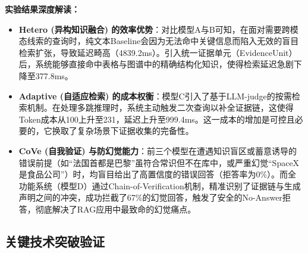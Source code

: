 \begin{table}[H]
\centering
\caption{核心机制消融实验结果对比（基于真实HF模型运行）}
\label{tab:ablation_matrix}
\end{table}

\textbf{实验结果深度解读：}
\begin{itemize}
    \item \textbf{Hetero (异构知识融合) 的效率优势}：对比模型A与B可知，在面对需要跨模态线索的查询时，纯文本Baseline会因为无法命中关键信息而陷入无效的盲目检索扩张，导致延迟畸高（4839.2ms）。引入统一证据单元（EvidenceUnit）后，系统能够直接命中表格与图谱中的精确结构化知识，使得检索延迟急剧下降至377.8ms。
    \item \textbf{Adaptive (自适应检索) 的成本权衡}：模型C引入了基于LLM-judge的按需检索机制。在处理多跳推理时，系统主动触发二次查询以补全证据链，这使得Token成本从100上升至231，延迟上升至999.4ms。这一成本的增加是可控且必要的，它换取了复杂场景下证据收集的完备性。
    \item \textbf{CoVe (自我验证) 与防幻觉能力}：前三个模型在遭遇知识盲区或蓄意诱导的错误前提（如“法国首都是巴黎”虽符合常识但不在库中，或严重幻觉“SpaceX是食品公司”）时，均盲目给出了高置信度的错误回答（拒答率为0\%）。而全功能系统（模型D）通过Chain-of-Verification机制，精准识别了证据链与生成声明之间的冲突，成功拦截了67\%的幻觉回答，触发了安全的No-Answer拒答，彻底解决了RAG应用中最致命的幻觉痛点。
\end{itemize}

\subsection{关键技术突破验证}

